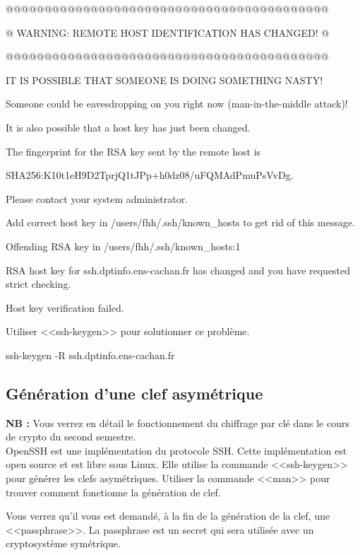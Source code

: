 \documentclass[11pt]{article}
\begin{document}
\begin{solution}

@@@@@@@@@@@@@@@@@@@@@@@@@@@@@@@@@@@@@@@@@@

@ WARNING: REMOTE HOST IDENTIFICATION HAS CHANGED! @

@@@@@@@@@@@@@@@@@@@@@@@@@@@@@@@@@@@@@@@@@@

IT IS POSSIBLE THAT SOMEONE IS DOING SOMETHING NASTY!

Someone could be eavesdropping on you right now (man-in-the-middle attack)!

It is also possible that a host key has just been changed.

The fingerprint for the RSA key sent by the remote host is

SHA256:K10t1eH9D2TprjQ1tJPp+h0dz08/uFQMAdPmuPsVvDg.

Please contact your system administrator.

Add correct host key in /users/fhh/.ssh/known\_hosts to get rid of this message.

Offending RSA key in /users/fhh/.ssh/known\_hosts:1

RSA host key for ssh.dptinfo.ens-cachan.fr has changed and you have requested strict checking.

Host key verification failed.
\end{solution}

Utiliser <<ssh-keygen>> pour solutionner ce problème.

\begin{solution}

ssh-keygen -R ssh.dptinfo.ens-cachan.fr
\end{solution}

\subsection{Génération d’une clef asymétrique}

\textbf{NB : } Vous verrez en détail le fonctionnement du chiffrage par clé dans le cours de crypto du second semestre.\\

OpenSSH est une implémentation du protocole SSH. Cette implémentation est open source et est libre sous Linux. Elle utilise la commande <<ssh-keygen>> pour générer
les clefs asymétriques. Utiliser la commande <<man>> pour trouver comment fonctionne la génération de clef.

Vous verrez qu’il vous est demandé, à la fin de la génération de la clef, une <<passphrase>>. La passphrase est un secret 
qui sera utilisée avec un cryptosystème symétrique.
\end{document}

